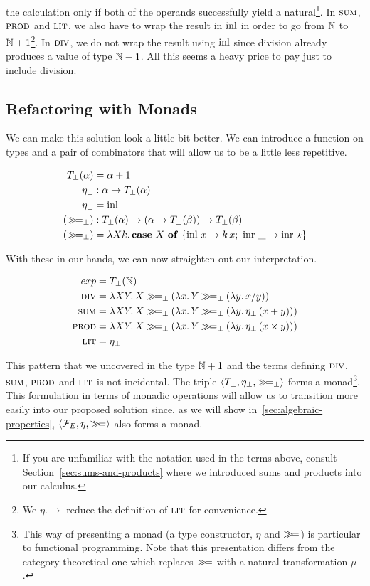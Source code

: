 the calculation only if both of the operands successfully yield a
natural\footnote{If you are unfamiliar with the notation used in the terms
  above, consult Section~\ref{sec:sums-and-products} where we introduced
  sums and products into our calculus.}. In $\textsc{sum}$, $\textsc{prod}$ and $\textsc{lit}$,
we also have to wrap the result in $\operatorname{inl}$ in order to go from $\mathbb{N}$ to $\mathbb{N}
+ 1$\footnote{We $\eta.\to$ reduce the definition of $\textsc{lit}$ for
  convenience.}. In $\textsc{div}$, we do not wrap the result using $\operatorname{inl}$ since
division already produces a value of type $\mathbb{N} + 1$. All this seems a heavy
price to pay just to include division.

\subsection{Refactoring with Monads}
\label{ssec:refactoring-with-monads}

We can make this solution look a little bit better. We can introduce a
function on types and a pair of combinators that will allow us to be a
little less repetitive.

\begin{align*}
  T_\bot(\alpha) &= \alpha + 1 \\
  \eta_\bot &: \alpha \to T_\bot(\alpha) \\
  \eta_\bot &= \operatorname{inl} \\
  (\mathbin{\gg\!=}_\bot) &: T_\bot(\alpha) \to (\alpha \to T_\bot(\beta)) \to T_\bot(\beta) \\
  (\mathbin{\gg\!=}_\bot) &= \lambda X k.\, \text{\textbf{case} $X$ \textbf{of} $\{ \operatorname{inl}\,x \to k\,x;\ \operatorname{inr}\,\_ \to \operatorname{inr}\,\star \}$}
\end{align*}

With these in our hands, we can now straighten out our interpretation.

\begin{align*}
  exp &= T_\bot(\mathbb{N}) \\
  \textsc{div} &= \lambda X Y.\, X \mathbin{\gg\!=}_\bot (\lambda x.\, Y \mathbin{\gg\!=}_\bot (\lambda y.\, x / y)) \\
  \textsc{sum} &= \lambda X Y.\, X \mathbin{\gg\!=}_\bot (\lambda x.\, Y \mathbin{\gg\!=}_\bot (\lambda y.\, \eta_\bot\,(x + y))) \\
  \textsc{prod} &= \lambda X Y.\, X \mathbin{\gg\!=}_\bot (\lambda x.\, Y \mathbin{\gg\!=}_\bot (\lambda y.\, \eta_\bot\,(x \times y))) \\
  \textsc{lit} &= \eta_\bot
\end{align*}

This pattern that we uncovered in the type $\mathbb{N} + 1$ and the terms defining
$\textsc{div}$, $\textsc{sum}$, $\textsc{prod}$ and $\textsc{lit}$ is not incidental. The triple
$\left<T_\bot, \eta_\bot, \mathbin{\gg\!=}_\bot \right>$ forms a monad\footnote{This
  way of presenting a monad (a type constructor, $\eta$ and $\mathbin{\gg\!=}$) is
  particular to functional programming. Note that this presentation differs
  from the category-theoretical one which replaces $\mathbin{\gg\!=}$ with a natural
  transformation $\mu$ \cite{mac1978categories}.}. This formulation in
terms of monadic operations will allow us to transition more easily into
our proposed solution since, as we will show
in~\ref{sec:algebraic-properties}, $\left< \mathcal{F}_E, \eta, \mathbin{\gg\!=} \right>$
also forms a monad.

